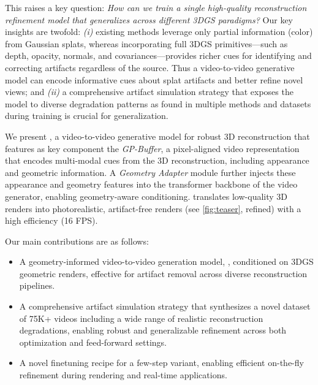 This raises a key question: 
\textit{How can we train a single high-quality reconstruction refinement model that generalizes across different 3DGS paradigms?}
Our key insights are twofold: \emph{(i)} existing methods leverage only partial information (color) from Gaussian splats, whereas incorporating full 3DGS primitives—such as depth, opacity, normals, and covariances—provides richer cues for identifying and correcting artifacts regardless of the source. Thus a video-to-video generative model can encode informative cues about splat artifacts and better refine novel views; and 
\emph{(ii)} a comprehensive artifact simulation strategy that exposes the model to diverse degradation patterns as found in multiple methods and datasets during training is crucial for generalization. 

We present \ours, a video-to-video generative model for robust 3D reconstruction that features as key component the \textit{GP-Buffer}, a pixel-aligned video representation that encodes multi-modal cues from the 3D reconstruction, including appearance and geometric information. A \textit{Geometry Adapter} module further injects these appearance and geometry features into the transformer backbone of the video generator, enabling geometry-aware conditioning. 
\ours translates low-quality 3D renders into photorealistic, artifact-free renders (see \cref{fig:teaser}, refined) with a high efficiency (16 FPS).

Our main contributions are as follows:
\begin{itemize}
    \item A geometry-informed video-to-video generation model, \ours, conditioned on 3DGS geometric renders, effective for artifact removal across diverse reconstruction pipelines. 
    \item A comprehensive artifact simulation strategy that synthesizes a novel dataset of 75K+ videos including a wide range of realistic reconstruction degradations, enabling robust and generalizable refinement across both optimization and feed-forward settings.
    \item A novel finetuning recipe for a few-step variant, enabling efficient on-the-fly refinement during rendering and real-time applications.
\end{itemize}











